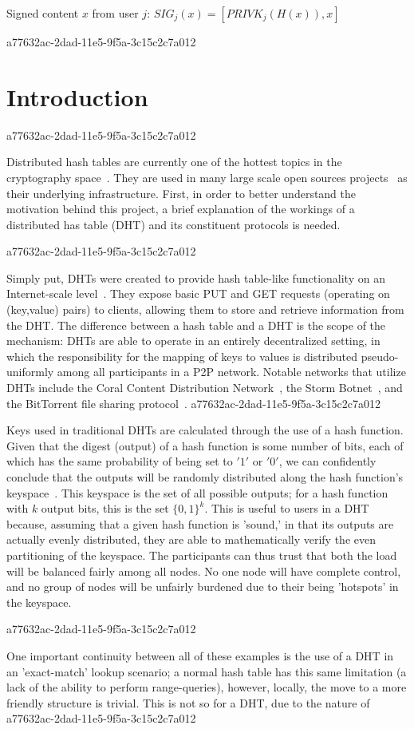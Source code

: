\documentclass[12pt]{article}
\begin{document}
Signed content $x$ from user $j$: $SIG_j(x) = \left[ PRIVK_j( H(x) ), x \right]$

a77632ac-2dad-11e5-9f5a-3c15c2c7a012\section{Introduction}
a77632ac-2dad-11e5-9f5a-3c15c2c7a012\par Distributed hash tables are currently one of the hottest topics in the cryptography space~\cite{Stoica:2001dj,Rowstron:2001ea,Ratnasamy:2001wn}. They are used in many large scale open sources projects~\cite{Freitas:2013tb,Xu:2010vs,Perfitt:2010fh} as their underlying infrastructure. First, in order to better understand the motivation behind this project, a brief explanation of the workings of a distributed has table (DHT) and its constituent protocols is needed.

a77632ac-2dad-11e5-9f5a-3c15c2c7a012\par Simply put, DHTs were created to provide hash table-like functionality on an Internet-scale level~\cite{Ratnasamy:2001wn}. They expose basic PUT and GET requests (operating on (key,value) pairs) to clients, allowing them to store and retrieve information from the DHT. The difference between a hash table and a DHT is the scope of the mechanism: DHTs are able to operate in an entirely decentralized setting, in which the responsibility for the mapping of keys to values is distributed pseudo-uniformly among all participants in a P2P network. Notable networks that utilize DHTs include the Coral Content Distribution Network~\cite{Freedman:2004vb}, the Storm Botnet~\cite{Holz:2008uk}, and the BitTorrent file sharing protocol~\cite{Cohen:y1_8mBnw}.
a77632ac-2dad-11e5-9f5a-3c15c2c7a012
\par Keys used in traditional DHTs are calculated through the use of a hash function. Given that the digest (output) of a hash function is some number of bits, each of which has the same probability of being set to $'1'$ or $'0'$, we can confidently conclude that the outputs will be randomly distributed along the hash function's keyspace~. This keyspace is the set of all possible outputs; for a hash function with $k$ output bits, this is the set $\{0,1\}^k$. This is useful to users in a DHT because, assuming that a given hash function is 'sound,' in that its outputs are actually evenly distributed, they are able to mathematically verify the even partitioning of the keyspace. The participants can thus trust that both the load will be balanced fairly among all nodes. No one node will have complete control, and no group of nodes will be unfairly burdened due to their being 'hotspots' in the keyspace.~

a77632ac-2dad-11e5-9f5a-3c15c2c7a012\par One important continuity between all of these examples is the use of a DHT in an 'exact-match' lookup scenario; a normal hash table has this same limitation (a lack of the ability to perform range-queries), however, locally, the move to a more friendly structure is trivial. This is not so for a DHT, due to the nature of
\printbibliography
a77632ac-2dad-11e5-9f5a-3c15c2c7a012
\end{document}
